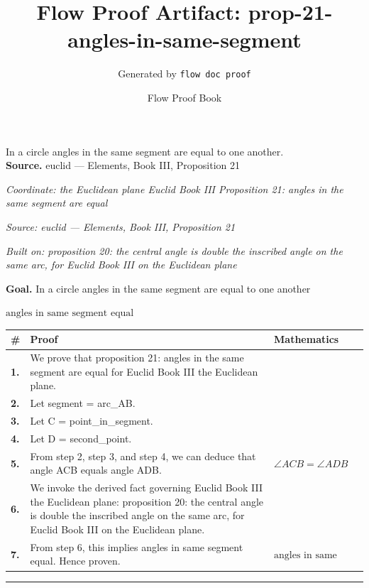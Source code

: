 \documentclass[11pt]{article}
\title{Flow Proof Artifact: prop-21-angles-in-same-segment}
\author{Generated by \texttt{flow doc proof}}
\date{Flow Proof Book}
\theoremstyle{definition}
\begin{document}
\maketitle
In a circle angles in the same segment are equal to one another.\\[0.5em]
\textbf{Source.} euclid — Elements, Book III, Proposition 21\\[0.5em]
\bigskip
{}\par
\smallskip\noindent\textit{Coordinate: the Euclidean plane \cdot Euclid Book III \cdot Proposition 21: angles in the same segment are equal}\par
\smallskip\noindent\textit{Source: euclid — Elements, Book III, Proposition 21}\par
\smallskip\noindent\textit{Built on: proposition 20: the central angle is double the inscribed angle on the same arc, for Euclid Book III on the Euclidean plane}\par
\medskip
\noindent\textbf{Goal.} In a circle angles in the same segment are equal to one another\par
\noindent$\displaystyle \text{angles in same segment equal}$\par
\medskip
\noindent
\begin{tabular}{@{} >{\raggedright\arraybackslash}p{} >{\raggedright\arraybackslash}p{} >{\raggedleft\arraybackslash}p{} @{}}
\textbf{\#} & \textbf{Proof} & \textbf{Mathematics} \\
\midrule
\textbf{1.} & We prove that proposition 21: angles in the same segment are equal for Euclid Book III the Euclidean plane. & \\[0.45em]
\textbf{2.} & Let segment = arc\_AB. & \\[0.45em]
\textbf{3.} & Let C = point\_in\_segment. & \\[0.45em]
\textbf{4.} & Let D = second\_point. & \\[0.45em]
\textbf{5.} & From step 2, step 3, and step 4, we can deduce that angle ACB equals angle ADB. & $\displaystyle \angle ACB = \angle ADB$ \\[0.45em]
\textbf{6.} & We invoke the derived fact governing Euclid Book III the Euclidean plane: proposition 20: the central angle is double the inscribed angle on the same arc, for Euclid Book III on the Euclidean plane. & \\[0.45em]
\textbf{7.} & From step 6, this implies angles in same segment equal. Hence proven. & $\displaystyle \text{angles in same segment equal}$ \\[0.45em]
\bottomrule
\end{tabular}
\label{thm:Geometry-Euclid Book III-proposition_21_angles_in_the_same_segment_are_equal}
\par\medskip\hrule
\end{document}
